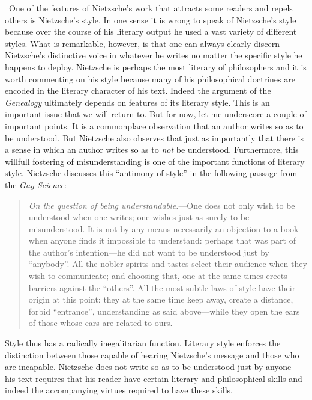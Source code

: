 \change\ One of the features of Nietzsche's work that attracts some readers and repels others is Nietzsche's style. In one sense it is wrong to speak of Nietzsche's style because over the course of his literary output he used a vast variety of different styles. What is remarkable, however, is that one can always clearly discern Nietzsche's distinctive voice in whatever he writes no matter the specific style he happens to deploy. Nietzsche is perhaps the most literary of philosophers and it is worth commenting on his style because many of his philosophical doctrines are encoded in the literary character of his text. Indeed the argument of the \emph{Genealogy} ultimately depends on features of its literary style. This is an important issue that we will return to. But for now, let me underscore a couple of important points. It is a commonplace observation that an author writes so as to be understood. But Nietzsche also observes that just as importantly that there is a sense in which an author writes so as to \emph{not} be understood. Furthermore, this willfull fostering of misunderstanding is one of the important functions of literary style. Nietzsche discusses this ``antimony of style'' in the following passage from the \emph{Gay Science}:
\begin{quote}
    \emph{On the question of being understandable.}---One does not only wish to be understood when one writes; one wishes just as surely to be misunderstood. It is not by any means necessarily an objection to a book when anyone finds it impossible to understand: perhaps that was part of the author's intention---he did not want to be understood just by ``anybody''. All the nobler spirits and tastes select their audience when they wish to communicate; and choosing that, one at the same times erects barriers against the ``others''. All the most subtle laws of style have their origin at this point: they at the same time keep away, create a distance, forbid ``entrance'', understanding as said above---while they open the ears of those whose ears are related to ours.
\end{quote}
Style thus has a radically inegalitarian function. Literary style enforces the distinction between those capable of hearing Nietzsche's message and those who are incapable. Nietzsche does not write so as to be understood just by anyone---his text requires that his reader have certain literary and philosophical skills and indeed the accompanying virtues required to have these skills.

